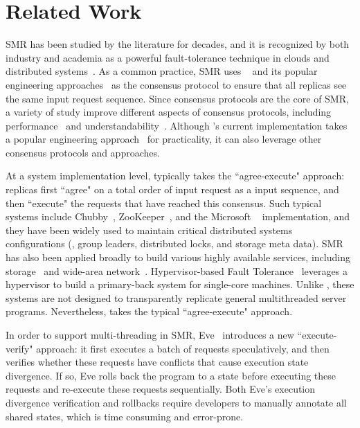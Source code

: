 \section{Related Work} \label{sec:related}
  SMR has been studied by the literature 
for decades, and it is recognized by both industry and academia as a powerful 
fault-tolerance technique in clouds and distributed 
systems~\cite{lamportclock,smr:tutorial}. As a common practice, SMR uses 
\paxos~\cite{paxos,paxos:simple,paxos:complex} and its popular engineering 
approaches~\cite{paxos:live,paxos:practical} as the consensus protocol to 
ensure that all replicas see the same input request sequence. Since consensus 
protocols are the core of SMR, a variety of study improve different aspects of 
consensus protocols, including performance~\cite{epaxos:sosp13,paxos:fast} and 
understandability~\cite{raft:usenix14}. Although \xxx's current implementation 
takes a popular engineering approach~\cite{paxos:practical} for practicality, 
it can also leverage other consensus protocols and approaches.


At a system implementation level, \smr typically takes the ``agree-execute" 
approach: replicas first ``agree" on a total order of input request as a input 
sequence, and then ``execute" the requests that have reached this consensus. 
Such typical systems include Chubby~\cite{chubby:osdi}, 
ZooKeeper~\cite{zookeeper}, and the Microsoft \paxos~\cite{paxos} 
implementation, and they have been widely used to maintain critical distributed 
systems configurations (\eg, group leaders, distributed locks, and storage meta 
data). SMR has also been applied broadly to build various highly available 
services, including 
storage~\cite{paxos:datastore,bolosky:nsdi11,spanner:osdi12} and wide-area 
network~\cite{mencius:osdi08}. Hypervisor-based Fault 
Tolerance~\cite{hft:sosp95} leverages a hypervisor to build a primary-back 
system for single-core machines. Unlike \xxx, these systems are not designed to 
transparently replicate general multithreaded server programs. Nevertheless, 
\xxx takes the typical ``agree-execute" approach.


In order to support multi-threading in SMR, Eve~\cite{eve:osdi12} introduces a 
new ``execute-verify" approach: it first executes a batch of requests 
speculatively, and then verifies whether these requests have conflicts that 
cause execution state divergence. If so, Eve rolls back the program to a state 
before executing these requests and re-execute these requests sequentially. 
Both Eve's execution divergence verification and rollbacks require developers 
to manually annotate all shared states, which is time consuming and 
error-prone. 

